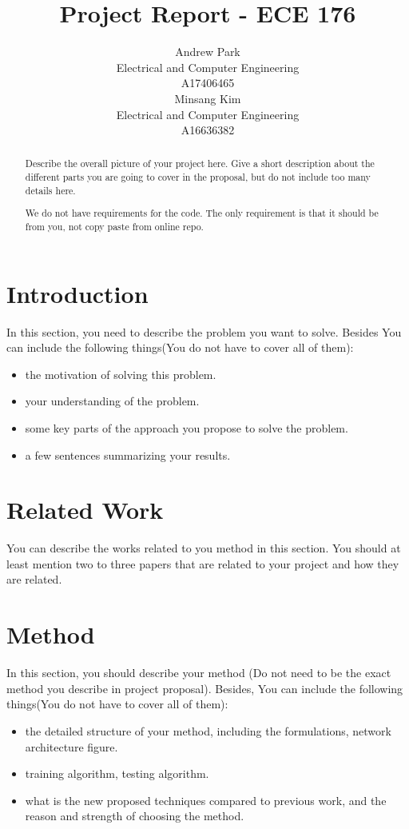 \documentclass{article}
\title{Project Report - ECE 176}
\author{%
  Andrew Park \\
  Electrical and Computer Engineering\\
  A17406465\\
  \And
  Minsang Kim \\
  Electrical and Computer Engineering\\
  A16636382 \\
}
\begin{document}
\maketitle

\begin{abstract}
    Describe the overall picture of your project here. Give a short description about the different parts you are going to cover in the proposal, but do not include too many details here.
    
    We do not have requirements for the code. The only requirement is that it should be from you, not copy paste from online repo.
    

\end{abstract}

\section{Introduction}

In this section, you need to describe the problem you want to solve. Besides You can include the following things(You do not have to cover all of them):
\begin{itemize}
    \item the motivation of solving this problem.
    \item your understanding of the problem.
    \item some key parts of the approach you propose to solve the problem.
    \item a few sentences summarizing your results.
\end{itemize}

\section{Related Work}

You can describe the works related to you method in this section. You should at least mention two to three papers that are related to your project and how they are related.

\section{Method}

In this section, you should describe your method (Do not need to be the exact method you describe in project proposal). Besides, You can include the following things(You do not have to cover all of them): 

\begin{itemize}
    \item the detailed structure of your method, including the formulations, network architecture figure.
    \item training algorithm, testing algorithm.
    \item what is the new proposed techniques compared to previous work, and the reason and strength of choosing the method.
\end{itemize}
\end{document}
